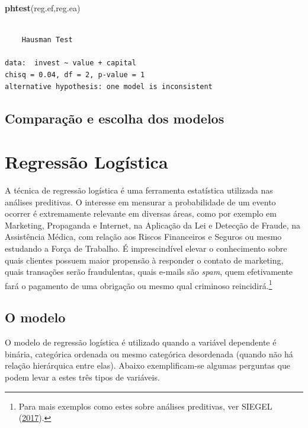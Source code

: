 \documentclass[12pt,brazil,oneside]{book}
\newenvironment{Shaded}{\begin{snugshade}}{\end{snugshade}}
\newcommand{\KeywordTok}[1]{\textcolor[rgb]{0.13,0.29,0.53}{\textbf{#1}}}
\newcommand{\NormalTok}[1]{#1}
\let\rmarkdownfootnote\footnote%
\def\footnote{\protect\rmarkdownfootnote}
\begin{document}
\begin{Shaded}
\begin{Highlighting}[]
\KeywordTok{phtest}\NormalTok{(reg.ef,reg.ea)}
\end{Highlighting}
\end{Shaded}

\begin{verbatim}

    Hausman Test

data:  invest ~ value + capital
chisq = 0.04, df = 2, p-value = 1
alternative hypothesis: one model is inconsistent
\end{verbatim}

\hypertarget{comparacao-e-escolha-dos-modelos}{%
\section{Comparação e escolha dos
modelos}\label{comparacao-e-escolha-dos-modelos}}

\hypertarget{regressao-logistica}{%
\chapter{Regressão Logística}\label{regressao-logistica}}

A técnica de regressão logística é uma ferramenta estatística utilizada
nas análises preditivas. O interesse em mensurar a probabilidade de um
evento ocorrer é extremamente relevante em diversas áreas, como por
exemplo em Marketing, Propaganda e Internet, na Aplicação da Lei e
Detecção de Fraude, na Assistência Médica, com relação aos Riscos
Financeiros e Seguros ou mesmo estudando a Força de Trabalho. É
imprescindível elevar o conhecimento sobre quais clientes possuem maior
propensão à responder o contato de marketing, quais transações serão
fraudulentas, quais e-mails são \emph{spam}, quem efetivamente fará o
pagamento de uma obrigação ou mesmo qual criminoso reincidirá.\footnote{Para
  mais exemplos como estes sobre análises preditivas, ver SIEGEL
  (\protect\hyperlink{ref-Siegel2017}{2017}).}

\hypertarget{o-modelo}{%
\section{O modelo}\label{o-modelo}}

O modelo de regressão logística é utilizado quando a variável dependente
é binária, categórica ordenada ou mesmo categórica desordenada (quando
não há relação hierárquica entre elas). Abaixo exemplificam-se algumas
perguntas que podem levar a estes três tipos de variáveis.
\end{document}
